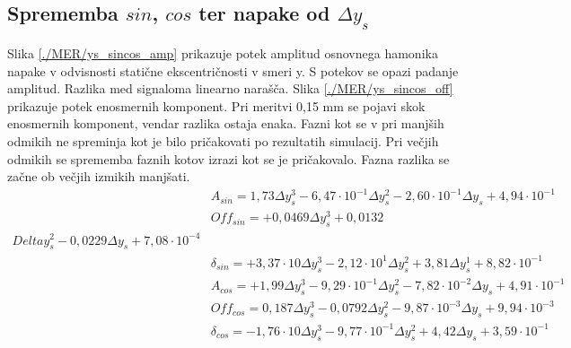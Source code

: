 \subsection{Sprememba $sin$, $cos$ ter napake od $\Delta y_s$}
Slika \ref{./MER/ys_sincos_amp} prikazuje potek amplitud osnovnega hamonika napake v odvisnosti statične ekscentričnosti v smeri y. S potekov se opazi padanje amplitud. Razlika med signaloma linearno narašča. 
Slika \ref{./MER/ys_sincos_off} prikazuje potek enosmernih komponent. Pri meritvi 0,15 mm se pojavi skok enosmernih komponent, vendar razlika ostaja enaka.
Fazni kot se v pri manjših odmikih ne spreminja kot je bilo pričakovati po rezultatih simulacij. Pri večjih odmikih se sprememba faznih kotov izrazi kot se je pričakovalo. Fazna razlika se začne ob večjih izmikih manjšati.
\begin{eqnarray}
&A_{sin} = 1,73            \Delta y_s^3-6,47\cdot 10^{-1}\Delta y_s^2-2,60\cdot 10^{-1}\Delta y_s+4,94\cdot 10^{-1}            \\    
&Off_{sin} = +0,0469\Delta y_s^3+0,0132\\Delta y_s^2-0,0229\Delta y_s+7,08\cdot 10^{-4}            \\ 
&\delta_{sin} = +3,37\cdot 10    \Delta y_s^3-2,12\cdot 10^{1}\Delta y_s^2+3,81            \Delta y_s^1+8,82\cdot 10^{-1}            \\ 
&A_{cos} = +1,99            \Delta y_s^3-9,29\cdot 10^{-1}\Delta y_s^2-7,82\cdot 10^{-2}\Delta y_s+4,91\cdot 10^{-1}            \\    
&Off_{cos} = 0,187\Delta y_s^3-0,0792\Delta y_s^2-9,87\cdot 10^{-3}\Delta y_s+9,94\cdot 10^{-3}            \\ 
&\delta_{cos} = -1,76\cdot 10    \Delta y_s^3-9,77\cdot 10^{-1}\Delta y_s^2+4,42            \Delta y_s+3,59\cdot 10^{-1}
\end{eqnarray}


